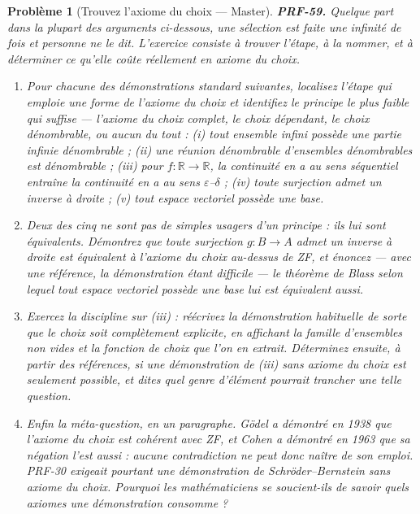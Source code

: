 \documentclass[11pt]{article}
\newtheorem{problem}{Problème}
\begin{document}
\bigskip

\begin{problem}[{Trouvez l'axiome du choix --- Master}]
\textbf{PRF-59.} Quelque part dans la plupart des arguments ci-dessous, une sélection
est faite une infinité de fois et personne ne le dit. L'exercice consiste à trouver l'étape,
à la nommer, et à déterminer ce qu'elle coûte réellement en axiome du choix.
\begin{enumerate}
\item[(a)] Pour chacune des démonstrations standard suivantes, localisez l'étape qui emploie une
forme de l'axiome du choix et identifiez le principe le plus faible qui suffise --- l'axiome
du choix complet, le choix dépendant, le choix dénombrable, ou aucun du tout : (i) tout
ensemble infini possède une partie infinie dénombrable ; (ii) une réunion dénombrable
d'ensembles dénombrables est dénombrable ; (iii) pour
$ f\colon \mathbb{R} \to \mathbb{R} $, la continuité en a au sens séquentiel entraîne la
continuité en a au sens $\varepsilon$--$\delta$ ; (iv) toute surjection admet un inverse à droite ; (v) tout
espace vectoriel possède une base.
\item[(b)] Deux des cinq ne sont pas de simples usagers d'un principe : ils lui sont équivalents.
Démontrez que \og{} toute surjection $ g\colon B \to A $ admet un inverse à droite \fg{} est
équivalent à l'axiome du choix au-dessus de ZF, et énoncez --- avec une référence, la
démonstration étant difficile --- le théorème de Blass selon lequel \og{} tout espace vectoriel
possède une base \fg{} lui est équivalent aussi.
\item[(c)] Exercez la discipline sur (iii) : réécrivez la démonstration habituelle de sorte que le
choix soit complètement explicite, en affichant la famille d'ensembles non vides et la
fonction de choix que l'on en extrait. Déterminez ensuite, à partir des références, si une
démonstration de (iii) sans axiome du choix est seulement possible, et dites quel genre
d'élément pourrait trancher une telle question.
\item[(d)] Enfin la méta-question, en un paragraphe. Gödel a démontré en 1938 que l'axiome du
choix est cohérent avec ZF, et Cohen a démontré en 1963 que sa négation l'est aussi : aucune
contradiction ne peut donc naître de son emploi. PRF-30 exigeait pourtant une démonstration
de Schröder--Bernstein sans axiome du choix. Pourquoi les mathématiciens se soucient-ils de
savoir quels axiomes une démonstration consomme ?
\end{enumerate}

\end{problem}
\end{document}
